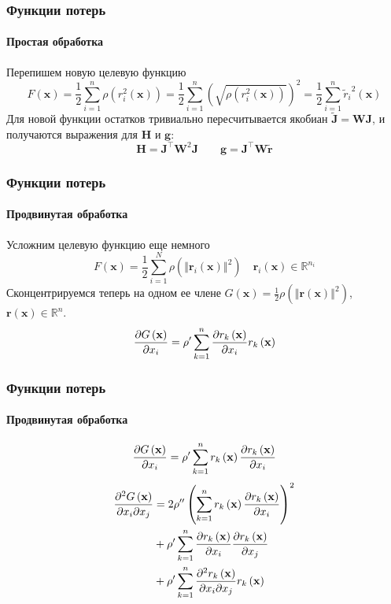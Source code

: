 \documentclass[notheorems,aspectratio=169]{beamer}
\begin{document}
\begin{frame}
  \frametitle{Функции потерь}
  \framesubtitle{Простая обработка}
  Перепишем новую целевую функцию
  $$F\left(\mathbf{x}\right)=\frac{1}{2}\sum_{i=1}^n\rho\left(r_i^2\left(\mathbf{x}\right)\right)=\frac{1}{2}\sum_{i=1}^n\left(\sqrt{\rho\left(r_i^2\left(\mathbf{x}\right)\right)}\right)^2=\frac{1}{2}\sum_{i=1}^n{\tilde{r}_i}^2\left(\mathbf{x}\right)$$
  Для новой функции остатков тривиально пересчитывается якобиан $\tilde{\mathbf{J}}=\mathbf{W}\mathbf{J}$, и получаются выражения для $\mathbf{H}$ и $\mathbf{g}$:
  $$\mathbf{H}=\mathbf{J}^\intercal \mathbf{W}^2\mathbf{J} \qquad \mathbf{g}=\mathbf{J}^\intercal\mathbf{W}\tilde{\mathbf{r}}$$
\end{frame}

\begin{frame}
  \frametitle{Функции потерь}
  \framesubtitle{Продвинутая обработка}
  Усложним целевую функцию еще немного
    $$F\left(\mathbf{x}\right)=\frac{1}{2}\sum_{i=1}^N\rho\left(\left\Vert\mathbf{r}_i\left(\mathbf{x}\right)\right\Vert^2\right) \quad \mathbf{r}_i\left(\mathbf{x}\right)\in\mathbb{R}^{n_i}$$
  Сконцентрируемся теперь на одном ее члене $G\left(\mathbf{x}\right)=\frac{1}{2}\rho\left(\left\Vert\mathbf{r}\left(\mathbf{x}\right)\right\Vert^2\right)$, $\mathbf{r}\left(\mathbf{x}\right)\in \mathbb{R}^n$.
    \begin{equation*}
      \begin{gathered}
        \pdv{G\left(\mathbf{x}\right)}{x_i}=\rho'\sum_{k=1}^n\pdv{r_k\left(\mathbf{x}\right)}{x_i}r_k\left(\mathbf{x}\right)
      \end{gathered}
    \end{equation*}
\end{frame}

\begin{frame}
  \frametitle{Функции потерь}
  \framesubtitle{Продвинутая обработка}

  \begin{equation*}
      \pdv{G\left(\mathbf{x}\right)}{x_i}=\rho'\sum_{k=1}^nr_k\left(\mathbf{x}\right)\pdv{r_k\left(\mathbf{x}\right)}{x_i}
  \end{equation*}
      {\begin{align}
        \pdv{G\left(\mathbf{x}\right)}{x_i}{x_j}
         & =2\rho''\left(\sum_{k=1}^nr_k\left(\mathbf{x}\right)\pdv{r_k\left(\mathbf{x}\right)}{x_i}\right)^2 \label{dd:1} \\
         & +\rho'\sum_{k=1}^n\pdv{r_k\left(\mathbf{x}\right)}{x_i}\pdv{r_k\left(\mathbf{x}\right)}{x_j} \label{dd:2} \\
         & +\rho'\sum_{k=1}^n\pdv{r_k\left(\mathbf{x}\right)}{x_i}{x_j}r_k\left(\mathbf{x}\right) \label{dd:3}
      \end{align}}
\end{frame}
\end{document}
